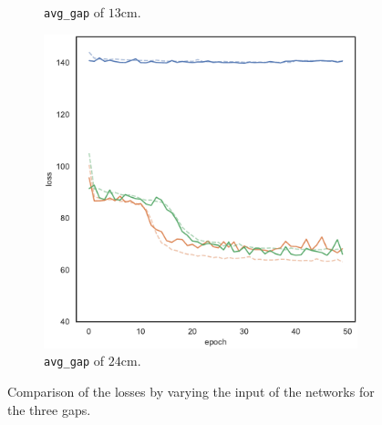 \begin{figure}[!htb]
\begin{subfigure}[h]{0.3\textwidth}
		\caption{\texttt{avg\_gap} of $13$\gls{cm}.}
	\end{subfigure}
	\hfill
	\begin{subfigure}[h]{0.3\textwidth}
		\centering
		\includegraphics[width=\textwidth]{contents/images/task1/loss-distributed-gap_24@copy}
		\caption{\texttt{avg\_gap} of $24$\gls{cm}.}
	\end{subfigure}
	\caption[Losses summary of the first set of experiments.]{Comparison 
	of the losses by varying the input of the networks for the three gaps.}
	\label{fig:distloss81324}
\end{figure}

